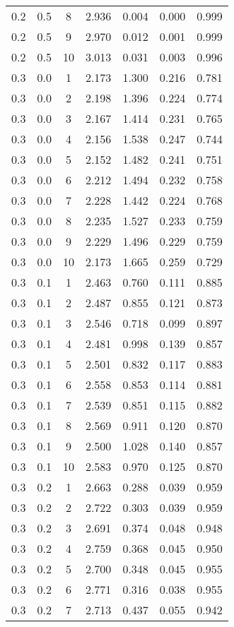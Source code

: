 \begin{tabular}{|c|c|c|c|c|c|c|}
0.2 & 0.5 & 8 & 2.936 & 0.004 & 0.000 & 0.999 \\
0.2 & 0.5 & 9 & 2.970 & 0.012 & 0.001 & 0.999 \\
0.2 & 0.5 & 10 & 3.013 & 0.031 & 0.003 & 0.996 \\
0.3 & 0.0 & 1 & 2.173 & 1.300 & 0.216 & 0.781 \\
0.3 & 0.0 & 2 & 2.198 & 1.396 & 0.224 & 0.774 \\
0.3 & 0.0 & 3 & 2.167 & 1.414 & 0.231 & 0.765 \\
0.3 & 0.0 & 4 & 2.156 & 1.538 & 0.247 & 0.744 \\
0.3 & 0.0 & 5 & 2.152 & 1.482 & 0.241 & 0.751 \\
0.3 & 0.0 & 6 & 2.212 & 1.494 & 0.232 & 0.758 \\
0.3 & 0.0 & 7 & 2.228 & 1.442 & 0.224 & 0.768 \\
0.3 & 0.0 & 8 & 2.235 & 1.527 & 0.233 & 0.759 \\
0.3 & 0.0 & 9 & 2.229 & 1.496 & 0.229 & 0.759 \\
0.3 & 0.0 & 10 & 2.173 & 1.665 & 0.259 & 0.729 \\
0.3 & 0.1 & 1 & 2.463 & 0.760 & 0.111 & 0.885 \\
0.3 & 0.1 & 2 & 2.487 & 0.855 & 0.121 & 0.873 \\
0.3 & 0.1 & 3 & 2.546 & 0.718 & 0.099 & 0.897 \\
0.3 & 0.1 & 4 & 2.481 & 0.998 & 0.139 & 0.857 \\
0.3 & 0.1 & 5 & 2.501 & 0.832 & 0.117 & 0.883 \\
0.3 & 0.1 & 6 & 2.558 & 0.853 & 0.114 & 0.881 \\
0.3 & 0.1 & 7 & 2.539 & 0.851 & 0.115 & 0.882 \\
0.3 & 0.1 & 8 & 2.569 & 0.911 & 0.120 & 0.870 \\
0.3 & 0.1 & 9 & 2.500 & 1.028 & 0.140 & 0.857 \\
0.3 & 0.1 & 10 & 2.583 & 0.970 & 0.125 & 0.870 \\
0.3 & 0.2 & 1 & 2.663 & 0.288 & 0.039 & 0.959 \\
0.3 & 0.2 & 2 & 2.722 & 0.303 & 0.039 & 0.959 \\
0.3 & 0.2 & 3 & 2.691 & 0.374 & 0.048 & 0.948 \\
0.3 & 0.2 & 4 & 2.759 & 0.368 & 0.045 & 0.950 \\
0.3 & 0.2 & 5 & 2.700 & 0.348 & 0.045 & 0.955 \\
0.3 & 0.2 & 6 & 2.771 & 0.316 & 0.038 & 0.955 \\
0.3 & 0.2 & 7 & 2.713 & 0.437 & 0.055 & 0.942 \\

\end{tabular}
